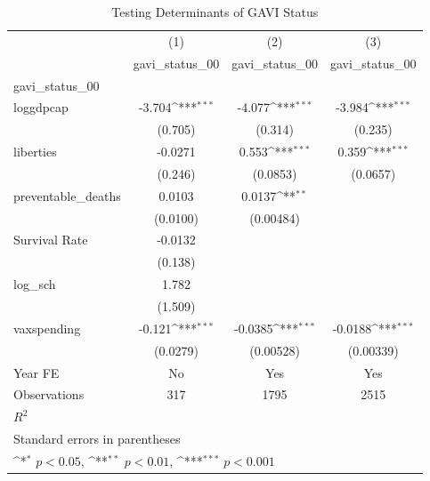 \begin{table}[htbp]\centering
\def\sym#1{\ifmmode^{#1}\else\(^{#1}\)\fi}
\caption{Testing Determinants of GAVI Status}
\begin{tabular}{l*{3}{c}}
\toprule
                &\multicolumn{1}{c}{(1)}&\multicolumn{1}{c}{(2)}&\multicolumn{1}{c}{(3)}\\
                &\multicolumn{1}{c}{gavi\_status\_00}&\multicolumn{1}{c}{gavi\_status\_00}&\multicolumn{1}{c}{gavi\_status\_00}\\
\midrule
gavi\_status\_00  &                  &                  &                  \\
loggdpcap       &   -3.704\sym{***}&   -4.077\sym{***}&   -3.984\sym{***}\\
                &  (0.705)         &  (0.314)         &  (0.235)         \\
\addlinespace
liberties       &  -0.0271         &    0.553\sym{***}&    0.359\sym{***}\\
                &  (0.246)         & (0.0853)         & (0.0657)         \\
\addlinespace
preventable\_deaths&   0.0103         &   0.0137\sym{**} &                  \\
                & (0.0100)         &(0.00484)         &                  \\
\addlinespace
Survival Rate   &  -0.0132         &                  &                  \\
                &  (0.138)         &                  &                  \\
\addlinespace
log\_sch         &    1.782         &                  &                  \\
                &  (1.509)         &                  &                  \\
\addlinespace
vaxspending     &   -0.121\sym{***}&  -0.0385\sym{***}&  -0.0188\sym{***}\\
                & (0.0279)         &(0.00528)         &(0.00339)         \\
\addlinespace
Year FE         &       No         &      Yes         &      Yes         \\
\midrule
Observations    &      317         &     1795         &     2515         \\
\(R^{2}\)       &                  &                  &                  \\
\bottomrule
\multicolumn{4}{l}{\footnotesize Standard errors in parentheses}\\
\multicolumn{4}{l}{\footnotesize \sym{*} \(p<0.05\), \sym{**} \(p<0.01\), \sym{***} \(p<0.001\)}\\
\end{tabular}
\end{table}
